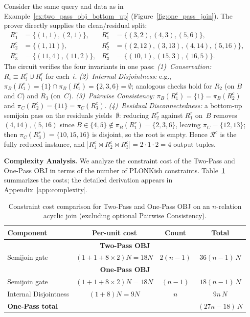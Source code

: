 \documentclass[sigconf]{acmart}
\renewcommand{\emph}[1]{\textit{#1}}
\begin{document}
\begin{example}
\label{ex:one_pass_obj}
Consider the same query and data as in Example~\ref{ex:two_pass_obj_bottom_up} (Figure~\ref{fig:one_pass_join}).
The prover directly supplies the clean/residual split:
\[
\begin{aligned}
R_1^c &= \{(1,1),(2,1)\}, & R_1^r &= \{(3,2),(4,3),(5,6)\},\\
R_2^c &= \{(1,11)\},      & R_2^r &= \{(2,12),(3,13),(4,14),(5,16)\},\\
R_3^c &= \{(11,4),(11,2)\}, & R_3^r &= \{(10,1),(15,3),(16,5)\}.
\end{aligned}
\]
The circuit verifies the four invariants in one pass:
\emph{(1)~Conservation:} $R_i \equiv R_i^c \cup R_i^r$ for each~$i$.
\emph{(2)~Internal Disjointness:} e.g., $\pi_B(R_1^c)\!=\!\{1\} \cap \pi_B(R_1^r)\!=\!\{2,3,6\} = \emptyset$; analogous checks hold for $R_2$ (on $B$ and $C$) and $R_3$ (on~$C$).
\emph{(3)~Pairwise Consistency:} $\pi_B(R_1^c)\!=\!\{1\}\!=\!\pi_B(R_2^c)$ and $\pi_C(R_2^c)\!=\!\{11\}\!=\!\pi_C(R_3^c)$.
\emph{(4)~Residual Disconnectedness:} a bottom-up semijoin pass on the residuals yields~$\emptyset$: reducing $R_2^r$ against $R_1^r$ on~$B$ removes $(4,14),(5,16)$ since $B\!\in\!\{4,5\}\!\notin\!\pi_B(R_1^r)\!=\!\{2,3,6\}$, leaving $\pi_C\!=\!\{12,13\}$; then $\pi_C(R_3^r)\!=\!\{10,15,16\}$ is disjoint, so the root is empty.
Hence $\mathcal{R}^c$ is the fully reduced instance, and $|R_1^c \bowtie R_2^c \bowtie R_3^c| = 2\!\cdot\!1\!\cdot\!2 = 4$ output tuples.
\end{example}


\noindent\textbf{Complexity Analysis.}
\label{sec:complexity}
We analyze the constraint cost of the Two-Pass and One-Pass OBJ in terms of the number of PLONKish constraints. Table~\ref{tab:constraint_comparison} summarizes the costs; the detailed derivation appears in Appendix~\ref{app:complexity}.

\begin{table}[h]
\centering
\small
\begin{tabular}{|l|c|c|c|}
\hline
\textbf{Component} & \textbf{Per-unit cost} & \textbf{Count} & \textbf{Total} \\
\hline
\multicolumn{4}{|c|}{\textbf{Two-Pass OBJ}} \\
\hline
Semijoin gate  & $(1{+}1{+}8{\times}2)N = 18N$ & $2(n{-}1)$ & $36(n{-}1)\,N$ \\
\hline
\multicolumn{4}{|c|}{\textbf{One-Pass OBJ}} \\
\hline
Semijoin gate  & $(1{+}1{+}8{\times}2)N = 18N$ & $(n{-}1)$ & $18(n{-}1)\,N$ \\
Internal Disjointness  & $(1{+}8)N = 9N$ & $n$ & $9n\,N$ \\
\hline
\textbf{One-Pass total} & & & $(27n{-}18)\,N$ \\
\hline
\end{tabular}
\caption{Constraint cost comparison for Two-Pass and One-Pass OBJ on an $n$-relation acyclic join (excluding optional Pairwise Consistency).}
\vspace{-0.2in}
\label{tab:constraint_comparison}
\end{table}
\end{document}
